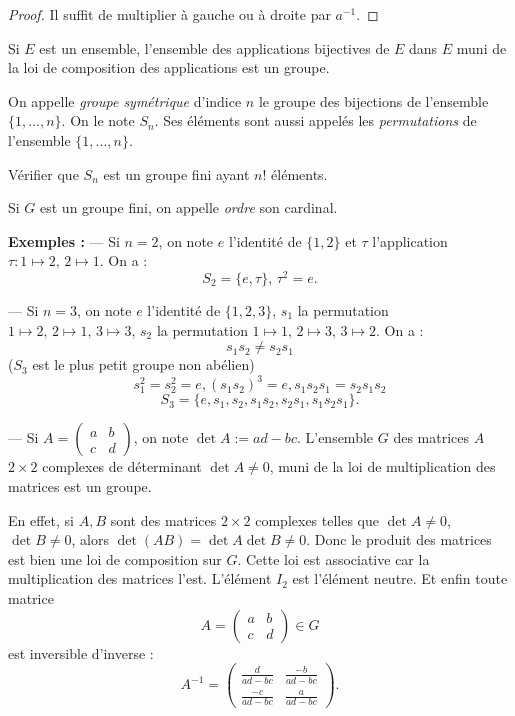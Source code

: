 \documentclass[class=report,crop=false]{standalone}
\begin{document}
\begin{proof}
Il suffit de multiplier à gauche ou à droite par $a^{-1}$.
\end{proof}


\begin{exercicecours}
Si $E$ est un ensemble, l'ensemble des applications bijectives de $E$ dans $E$ muni de la loi de composition des applications est un groupe.
\end{exercicecours}

\begin{definition}

On appelle {\it groupe symétrique} d'indice $n$ le groupe des bijections de l'ensemble $\{1,...,n\}$. On le note $S_n$. Ses éléments sont aussi appelés les {\it permutations} de l'ensemble $\{1,...,n\}$.
\end{definition}


\begin{exercicecours}
Vérifier que $S_n$ est un groupe fini ayant $n!$ éléments.
\end{exercicecours}


Si $G$ est un groupe fini, on appelle {\it ordre} son cardinal.

{\bf Exemples :} --- Si $n=2$, on note $e$ l'identité de $\{1,2\}$ et $\tau$ l'application $\tau : 1 \mapsto 2,\, 2 \mapsto 1$. On a : \[S_2 = \{e,\tau\},\, \tau^2 =e .\]


--- Si $n = 3$, on note $e$ l'identité de $\{1,2,3\}$, $s_1$ la permutation $1 \mapsto 2,\, 2 \mapsto 1,\, 3 \mapsto 3$, $s_2$ la permutation $1 \mapsto 1,\, 2 \mapsto 3,\, 3 \mapsto 2$. On a :
\[s_1s_2 \neq s_2s_1\]
($S_3$ est le plus petit groupe non abélien)
\[s_1^2=s_2^2 =e,(s_1s_2)^3 = e, s_1s_2s_1 =s_2s_1s_2 \]
\[S_3=\{e,s_1,s_2,s_1s_2,s_2s_1,s_1s_2s_1\} .\]

--- Si $A =\left(\begin{array}{cc}
a&b\\
c & d
\end{array}\right)$, on note $\det A := ad-bc$. L'ensemble $G$ des matrices $A$ $2 \times 2$ complexes de déterminant $\det A \neq 0$, muni de la loi de multiplication des matrices est un groupe.


En effet, si $A,B$ sont des matrices $2 \times 2$ complexes telles que $\det A \neq 0$, $\det B \neq 0$, alors $\det (AB) = \det A \det B \neq 0$. Donc le produit des matrices est bien une loi de composition sur $G$. Cette loi est associative car la multiplication des matrices l'est. L'élément $I_2$ est l'élément neutre. Et enfin toute matrice \[A=\left(\begin{array}{cc}
a&b\\
c & d
\end{array}\right) \in G\] est inversible d'inverse :
\[A^{-1} = \left(\begin{array}{cc}
\frac{d}{ad-bc}&\frac{-b}{ad-bc}\\
\frac{-c}{ad-bc} & \frac{a}{ad-bc}
\end{array}\right) .\] 
\end{document}
